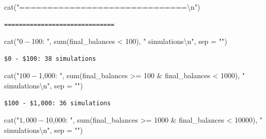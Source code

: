 \documentclass[
  letterpaper,
  DIV=11,
  numbers=noendperiod]{scrartcl}
\newenvironment{Shaded}{\begin{snugshade}}{\end{snugshade}}
\newcommand{\AttributeTok}[1]{\textcolor[rgb]{0.40,0.45,0.13}{#1}}
\newcommand{\DecValTok}[1]{\textcolor[rgb]{0.68,0.00,0.00}{#1}}
\newcommand{\FunctionTok}[1]{\textcolor[rgb]{0.28,0.35,0.67}{#1}}
\newcommand{\NormalTok}[1]{\textcolor[rgb]{0.00,0.23,0.31}{#1}}
\newcommand{\SpecialCharTok}[1]{\textcolor[rgb]{0.37,0.37,0.37}{#1}}
\newcommand{\StringTok}[1]{\textcolor[rgb]{0.13,0.47,0.30}{#1}}
\begin{document}
\begin{Shaded}
\begin{Highlighting}[]
\FunctionTok{cat}\NormalTok{(}\StringTok{"==============================}\SpecialCharTok{\textbackslash{}n}\StringTok{"}\NormalTok{)}
\end{Highlighting}
\end{Shaded}

\begin{verbatim}
==============================
\end{verbatim}

\begin{Shaded}
\begin{Highlighting}[]
\FunctionTok{cat}\NormalTok{(}\StringTok{"$0 {-} $100: "}\NormalTok{, }\FunctionTok{sum}\NormalTok{(final\_balances }\SpecialCharTok{\textless{}} \DecValTok{100}\NormalTok{), }\StringTok{" simulations}\SpecialCharTok{\textbackslash{}n}\StringTok{"}\NormalTok{, }\AttributeTok{sep =} \StringTok{""}\NormalTok{)}
\end{Highlighting}
\end{Shaded}

\begin{verbatim}
$0 - $100: 38 simulations
\end{verbatim}

\begin{Shaded}
\begin{Highlighting}[]
\FunctionTok{cat}\NormalTok{(}\StringTok{"$100 {-} $1,000: "}\NormalTok{, }\FunctionTok{sum}\NormalTok{(final\_balances }\SpecialCharTok{\textgreater{}=} \DecValTok{100} \SpecialCharTok{\&}\NormalTok{ final\_balances }\SpecialCharTok{\textless{}} \DecValTok{1000}\NormalTok{), }\StringTok{" simulations}\SpecialCharTok{\textbackslash{}n}\StringTok{"}\NormalTok{, }\AttributeTok{sep =} \StringTok{""}\NormalTok{)}
\end{Highlighting}
\end{Shaded}

\begin{verbatim}
$100 - $1,000: 36 simulations
\end{verbatim}

\begin{Shaded}
\begin{Highlighting}[]
\FunctionTok{cat}\NormalTok{(}\StringTok{"$1,000 {-} $10,000: "}\NormalTok{, }\FunctionTok{sum}\NormalTok{(final\_balances }\SpecialCharTok{\textgreater{}=} \DecValTok{1000} \SpecialCharTok{\&}\NormalTok{ final\_balances }\SpecialCharTok{\textless{}} \DecValTok{10000}\NormalTok{), }\StringTok{" simulations}\SpecialCharTok{\textbackslash{}n}\StringTok{"}\NormalTok{, }\AttributeTok{sep =} \StringTok{""}\NormalTok{)}
\end{Highlighting}
\end{Shaded}
\end{document}
